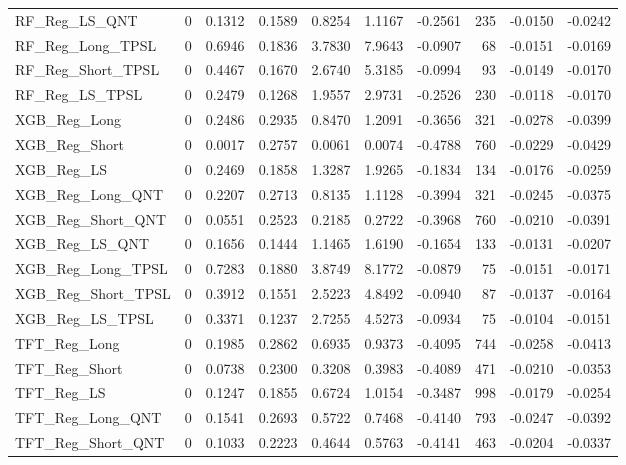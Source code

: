 \begin{tabular}{llrrrrrrrr}
\cline{1-10}
RF\_Reg\_LS\_QNT & 0 & 0.1312 & 0.1589 & 0.8254 & 1.1167 & -0.2561 & 235 & -0.0150 & -0.0242 \\
\cline{1-10}
RF\_Reg\_Long\_TPSL & 0 & 0.6946 & 0.1836 & 3.7830 & 7.9643 & -0.0907 & 68 & -0.0151 & -0.0169 \\
\cline{1-10}
RF\_Reg\_Short\_TPSL & 0 & 0.4467 & 0.1670 & 2.6740 & 5.3185 & -0.0994 & 93 & -0.0149 & -0.0170 \\
\cline{1-10}
RF\_Reg\_LS\_TPSL & 0 & 0.2479 & 0.1268 & 1.9557 & 2.9731 & -0.2526 & 230 & -0.0118 & -0.0170 \\
\cline{1-10}
XGB\_Reg\_Long & 0 & 0.2486 & 0.2935 & 0.8470 & 1.2091 & -0.3656 & 321 & -0.0278 & -0.0399 \\
\cline{1-10}
XGB\_Reg\_Short & 0 & 0.0017 & 0.2757 & 0.0061 & 0.0074 & -0.4788 & 760 & -0.0229 & -0.0429 \\
\cline{1-10}
XGB\_Reg\_LS & 0 & 0.2469 & 0.1858 & 1.3287 & 1.9265 & -0.1834 & 134 & -0.0176 & -0.0259 \\
\cline{1-10}
XGB\_Reg\_Long\_QNT & 0 & 0.2207 & 0.2713 & 0.8135 & 1.1128 & -0.3994 & 321 & -0.0245 & -0.0375 \\
\cline{1-10}
XGB\_Reg\_Short\_QNT & 0 & 0.0551 & 0.2523 & 0.2185 & 0.2722 & -0.3968 & 760 & -0.0210 & -0.0391 \\
\cline{1-10}
XGB\_Reg\_LS\_QNT & 0 & 0.1656 & 0.1444 & 1.1465 & 1.6190 & -0.1654 & 133 & -0.0131 & -0.0207 \\
\cline{1-10}
XGB\_Reg\_Long\_TPSL & 0 & 0.7283 & 0.1880 & 3.8749 & 8.1772 & -0.0879 & 75 & -0.0151 & -0.0171 \\
\cline{1-10}
XGB\_Reg\_Short\_TPSL & 0 & 0.3912 & 0.1551 & 2.5223 & 4.8492 & -0.0940 & 87 & -0.0137 & -0.0164 \\
\cline{1-10}
XGB\_Reg\_LS\_TPSL & 0 & 0.3371 & 0.1237 & 2.7255 & 4.5273 & -0.0934 & 75 & -0.0104 & -0.0151 \\
\cline{1-10}
TFT\_Reg\_Long & 0 & 0.1985 & 0.2862 & 0.6935 & 0.9373 & -0.4095 & 744 & -0.0258 & -0.0413 \\
\cline{1-10}
TFT\_Reg\_Short & 0 & 0.0738 & 0.2300 & 0.3208 & 0.3983 & -0.4089 & 471 & -0.0210 & -0.0353 \\
\cline{1-10}
TFT\_Reg\_LS & 0 & 0.1247 & 0.1855 & 0.6724 & 1.0154 & -0.3487 & 998 & -0.0179 & -0.0254 \\
\cline{1-10}
TFT\_Reg\_Long\_QNT & 0 & 0.1541 & 0.2693 & 0.5722 & 0.7468 & -0.4140 & 793 & -0.0247 & -0.0392 \\
\cline{1-10}
TFT\_Reg\_Short\_QNT & 0 & 0.1033 & 0.2223 & 0.4644 & 0.5763 & -0.4141 & 463 & -0.0204 & -0.0337 \\

\end{tabular}
